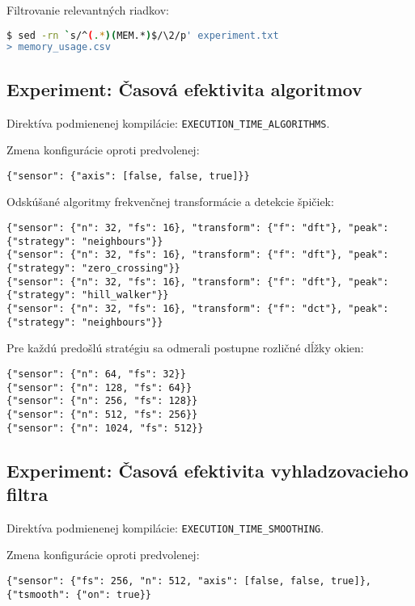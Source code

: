 Filtrovanie relevantných riadkov:
\begin{lstlisting}[style=messages, language=sh]
$ sed -rn `s/^(.*)(MEM.*)$/\2/p' experiment.txt 
> memory_usage.csv
\end{lstlisting}

\subsection*{Experiment: Časová efektivita algoritmov}
Direktíva podmienenej kompilácie: \verb|EXECUTION_TIME_ALGORITHMS|.

\noindent Zmena konfigurácie oproti predvolenej:
\begin{lstlisting}[style=experiments]
{"sensor": {"axis": [false, false, true]}}
\end{lstlisting}

\noindent Odskúšané algoritmy frekvenčnej transformácie a detekcie špičiek:
\begin{lstlisting}[style=experiments]
{"sensor": {"n": 32, "fs": 16}, "transform": {"f": "dft"}, "peak": {"strategy": "neighbours"}}
{"sensor": {"n": 32, "fs": 16}, "transform": {"f": "dft"}, "peak": {"strategy": "zero_crossing"}}
{"sensor": {"n": 32, "fs": 16}, "transform": {"f": "dft"}, "peak": {"strategy": "hill_walker"}}
{"sensor": {"n": 32, "fs": 16}, "transform": {"f": "dct"}, "peak": {"strategy": "neighbours"}}
\end{lstlisting}

\noindent Pre každú predošlú stratégiu sa odmerali postupne rozličné dĺžky okien:
\begin{lstlisting}[style=experiments]
{"sensor": {"n": 64, "fs": 32}}
{"sensor": {"n": 128, "fs": 64}}
{"sensor": {"n": 256, "fs": 128}}
{"sensor": {"n": 512, "fs": 256}}
{"sensor": {"n": 1024, "fs": 512}}
\end{lstlisting}


\subsection*{Experiment: Časová efektivita vyhladzovacieho filtra}
\noindent Direktíva podmienenej kompilácie: \verb|EXECUTION_TIME_SMOOTHING|.

\noindent Zmena konfigurácie oproti predvolenej:
\begin{lstlisting}[style=experiments]
{"sensor": {"fs": 256, "n": 512, "axis": [false, false, true]},  {"tsmooth": {"on": true}}
\end{lstlisting}

